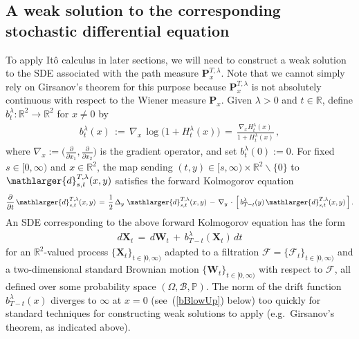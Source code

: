 \documentclass[10pt]{article}
\numberwithin{equation}{section}
\theoremstyle{definition}
\newcommand{\R}{{\mathbb R}}
\begin{document}
    
\subsection{A weak solution to the corresponding  stochastic differential equation}\label{SubsectionStochdDiff}
To apply It\^o calculus  in later sections, we will need to construct a  weak solution to the SDE associated with the path measure $ \mathbf{P}^{T,\lambda}_{x}$.  Note that we cannot simply rely on Girsanov's theorem for this purpose because  $ \mathbf{P}^{T,\lambda}_{x}$ is not absolutely continuous with respect to the Wiener measure $ \mathbf{P}_{x}$.  Given $\lambda >0$ and $t\in \R$, define 
$b_{t}^{\lambda}:\R^2\rightarrow \R^2$ for  $x\neq 0$ by
\begin{align}\label{DefDriftFun}
b_{t}^{\lambda}(x)\,:=\, \nabla_x  \,\log\big(  1+ H_{t}^{ \lambda}(x)   \big)   \,=\,\frac{ \nabla_x H_{t}^{\lambda} (x)  }{ 1+ H_{t}^{ \lambda}(x)  }\,,
\end{align}
where $\nabla_x:=\big(\frac{\partial}{\partial x_1}, \frac{\partial}{\partial x_2}\big)$ is the gradient operator, and set $b_{t}^{\lambda}(0):=0$.
 For fixed $s\in [0,\infty)$ and $x\in \R^2$,  the map  sending $ (t,y)\in [s,\infty)\times \R^2\backslash \{0\}$ to $ \mathlarger{d}_{s,t}^{T,\lambda }(x,y) $  satisfies the forward Kolmogorov equation
\begin{align}\label{KolmogorovForJ}
\frac{\partial}{\partial t} \,\mathlarger{d}_{s,t}^{T,\lambda}(x,y)\,=\,\frac{1}{2}\,\Delta_y  \,\,\mathlarger{d}_{s,t}^{T,\lambda}(x,y)\,-\,\nabla_y \,\cdot\,\Big[\, b_{T-t}^{\lambda}(y) \, \mathlarger{d}_{s,t}^{T,\lambda}(x,y) \,\Big] \,.
\end{align}
An SDE corresponding to the above forward Kolmogorov equation has the form
    \begin{align}\label{SDEToSolve}
        d\mathbf{X}_t\,=\,d\mathbf{W}_t\,+\,b_{T-t}^{\lambda}(\mathbf{X}_t)\,dt
    \end{align}
    for an $\R^2$-valued process  $\{ \mathbf{X}_t\}_{t\in [0,\infty)}$ adapted to a filtration $\mathscr{F}=\{ \mathscr{F}_t \}_{t\in [0,\infty)}$ and a two-dimensional standard Brownian motion  $\{ \mathbf{W}_t \}_{t\in [0,\infty)}$ with respect to $\mathscr{F}$, all defined over some probability space $(\Omega, \mathscr{B},\mathbb{P})$.   The norm of the drift function $b_{T-t}^{\lambda}(x)$   diverges to $\infty$ at $x=0$ (see~(\ref{bBlowUp}) below) too quickly for standard techniques for constructing weak solutions  to apply (e.g.\ Girsanov's theorem, as indicated above).
    
\end{document}
